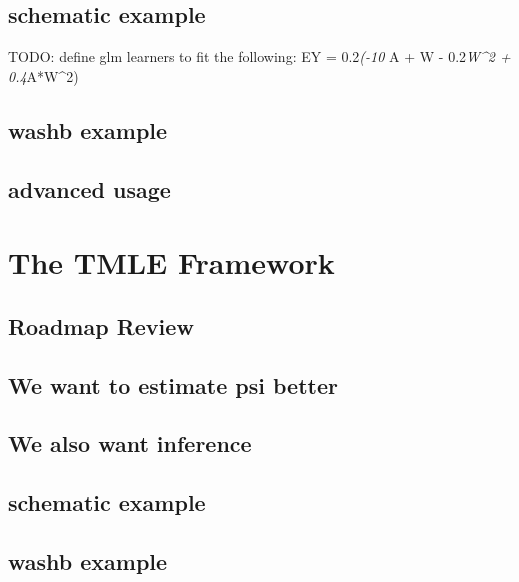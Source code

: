 \documentclass[
  12pt, krantz2,
]{krantz}
\theoremstyle{definition}
\theoremstyle{definition}
\theoremstyle{definition}
\newcommand{\1}{\mathbbm{1}}
\begin{document}
\hypertarget{schematic-example-2}{%
\section{schematic example}\label{schematic-example-2}}

TODO: define glm learners to fit the following:
EY = 0.2\emph{(-10 } A + W - 0.2\emph{W\^{}2 + 0.4}A*W\^{}2)

\hypertarget{washb-example-1}{%
\section{washb example}\label{washb-example-1}}

\hypertarget{advanced-usage-1}{%
\section{advanced usage}\label{advanced-usage-1}}

\hypertarget{tmle3}{%
\chapter{The TMLE Framework}\label{tmle3}}

\hypertarget{roadmap-review-2}{%
\section{Roadmap Review}\label{roadmap-review-2}}

\hypertarget{we-want-to-estimate-psi-better}{%
\section{We want to estimate psi better}\label{we-want-to-estimate-psi-better}}

\hypertarget{we-also-want-inference}{%
\section{We also want inference}\label{we-also-want-inference}}

\hypertarget{schematic-example-3}{%
\section{schematic example}\label{schematic-example-3}}

\hypertarget{washb-example-2}{%
\section{washb example}\label{washb-example-2}}
\end{document}
